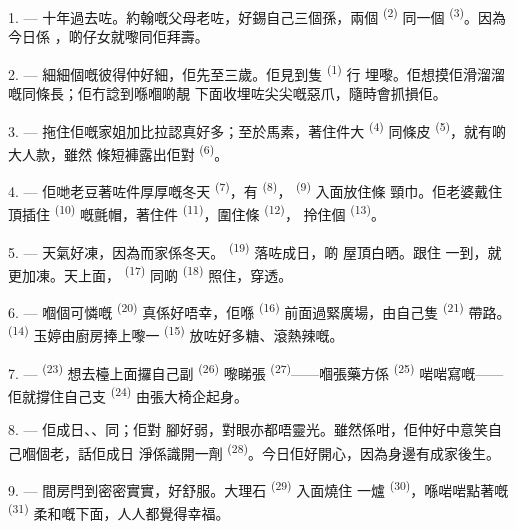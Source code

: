 1. --- 十年過去咗。約翰嘅父母老咗，好錫自己三個孫，兩個
\textsuperscript{(2)} 同一個 \textsuperscript{(3)}。因為今日係
，啲仔女就嚟同佢拜壽。

2. --- 細細個嘅彼得仲好細，佢先至三歲。佢見到隻 \textsuperscript{(1)} 行
埋嚟。佢想摸佢滑溜溜嘅同條長；佢冇諗到喺嗰啲靚
下面收埋咗尖尖嘅惡爪，隨時會抓損佢。

3. --- 拖住佢嘅家姐加比拉認真好多；至於馬素，著住件大
\textsuperscript{(4)} 同條皮 \textsuperscript{(5)}，就有啲大人款，雖然
條短褲露出佢對 \textsuperscript{(6)}。

4. --- 佢哋老豆著咗件厚厚嘅冬天 \textsuperscript{(7)}，有
 \textsuperscript{(8)}， \textsuperscript{(9)} 入面放住條
頸巾。佢老婆戴住頂插住 \textsuperscript{(10)} 嘅氈帽，著住件
 \textsuperscript{(11)}，圍住條 \textsuperscript{(12)}，
拎住個 \textsuperscript{(13)}。

5. --- 天氣好凍，因為而家係冬天。 \textsuperscript{(19)} 落咗成日，啲
屋頂白晒。跟住 一到，就更加凍。天上面， \textsuperscript{(17)}
同啲 \textsuperscript{(18)} 照住，穿透。

\VUsaut{4.2mm}
\VUsaut{3.0mm}

6. --- 嗰個可憐嘅 \textsuperscript{(20)} 真係好唔幸，佢喺
\textsuperscript{(16)} 前面過緊廣場，由自己隻 \textsuperscript{(21)}
帶路。
 \textsuperscript{(14)} 玉婷由廚房捧上嚟一 \textsuperscript{(15)}
放咗好多糖、滾熱辣嘅。

7. ---  \textsuperscript{(23)} 想去檯上面攞自己副
\textsuperscript{(26)} 嚟睇張 \textsuperscript{(27)}——嗰張藥方係
 \textsuperscript{(25)} 啱啱寫嘅——佢就撐住自己支
\textsuperscript{(24)} 由張大椅企起身。

8. --- 佢成日、、同；佢對
腳好弱，對眼亦都唔靈光。雖然係咁，佢仲好中意笑自己嗰個老，話佢成日
淨係識開一劑 \textsuperscript{(28)}。今日佢好開心，因為身邊有成家後生。

9. --- 間房閂到密密實實，好舒服。大理石 \textsuperscript{(29)} 入面燒住
一爐 \textsuperscript{(30)}，喺啱啱點著嘅 \textsuperscript{(31)}
柔和嘅下面，人人都覺得幸福。

